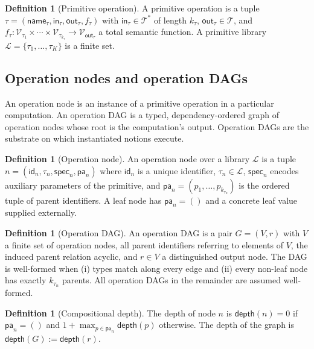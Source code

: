 \documentclass[11pt,a4paper]{article}
\theoremstyle{plain}
\theoremstyle{definition}
\newtheorem{definition}[theorem]{Definition}
\theoremstyle{remark}
\newcommand{\Lib}{\mathcal{L}}
\newcommand{\Types}{\mathcal{T}}
\newcommand{\Val}{\mathcal{V}}
\newcommand{\Spec}{\mathsf{spec}}
\newcommand{\Parents}{\mathsf{pa}}
\newcommand{\dep}{\mathsf{depth}}
\begin{document}
\begin{definition}[Primitive operation]
\label{def:primitive}
A primitive operation is a tuple $\tau = (\mathsf{name}_\tau, \mathsf{in}_\tau, \mathsf{out}_\tau, f_\tau)$ with $\mathsf{in}_\tau \in \Types^\ast$ of length $k_\tau$, $\mathsf{out}_\tau \in \Types$, and $f_\tau : \Val_{\tau_1} \times \cdots \times \Val_{\tau_{k_\tau}} \to \Val_{\mathsf{out}_\tau}$ a total semantic function. A primitive library $\Lib = \{\tau_1, \dots, \tau_K\}$ is a finite set.
\end{definition}

\subsection{Operation nodes and operation DAGs}

An operation node is an instance of a primitive operation in a particular computation. An operation DAG is a typed, dependency-ordered graph of operation nodes whose root is the computation's output. Operation DAGs are the substrate on which instantiated notions execute.

\begin{definition}[Operation node]
\label{def:opnode}
An operation node over a library $\Lib$ is a tuple $n = (\mathsf{id}_n, \tau_n, \Spec_n, \Parents_n)$ where $\mathsf{id}_n$ is a unique identifier, $\tau_n \in \Lib$, $\Spec_n$ encodes auxiliary parameters of the primitive, and $\Parents_n = (p_1, \dots, p_{k_{\tau_n}})$ is the ordered tuple of parent identifiers. A leaf node has $\Parents_n = ()$ and a concrete leaf value supplied externally.
\end{definition}

\begin{definition}[Operation DAG]
\label{def:opdag}
An operation DAG is a pair $G = (V, r)$ with $V$ a finite set of operation nodes, all parent identifiers referring to elements of $V$, the induced parent relation acyclic, and $r \in V$ a distinguished output node. The DAG is well-formed when (i) types match along every edge and (ii) every non-leaf node has exactly $k_{\tau_n}$ parents. All operation DAGs in the remainder are assumed well-formed.
\end{definition}

\begin{definition}[Compositional depth]
\label{def:depth}
The depth of node $n$ is $\dep(n) = 0$ if $\Parents_n = ()$ and $1 + \max_{p \in \Parents_n} \dep(p)$ otherwise. The depth of the graph is $\dep(G) := \dep(r)$.
\end{definition}
\end{document}
